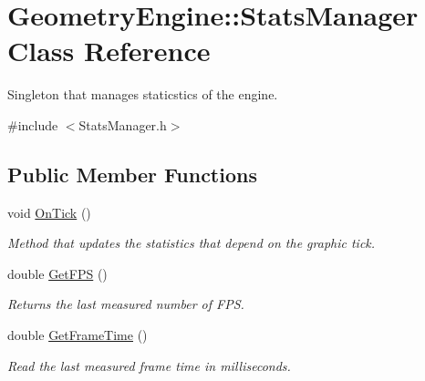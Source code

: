 \hypertarget{class_geometry_engine_1_1_stats_manager}{}\section{Geometry\+Engine\+::Stats\+Manager Class Reference}
\label{class_geometry_engine_1_1_stats_manager}


Singleton that manages staticstics of the engine.  




{\ttfamily \#include $<$Stats\+Manager.\+h$>$}

\subsection*{Public Member Functions}
\begin{DoxyCompactItemize}
\item 
\mbox{\label{class_geometry_engine_1_1_stats_manager_a7cafa3df522a5e8d3fa7cfce8d4a7e1e}} 
void \mbox{\hyperlink{class_geometry_engine_1_1_stats_manager_a7cafa3df522a5e8d3fa7cfce8d4a7e1e}{On\+Tick}} ()
\begin{DoxyCompactList}\small\item\em Method that updates the statistics that depend on the graphic tick. \end{DoxyCompactList}\item 
\mbox{\label{class_geometry_engine_1_1_stats_manager_ade8036883452fb26f29602899ad6f221}} 
double \mbox{\hyperlink{class_geometry_engine_1_1_stats_manager_ade8036883452fb26f29602899ad6f221}{Get\+F\+PS}} ()
\begin{DoxyCompactList}\small\item\em Returns the last measured number of F\+PS. \end{DoxyCompactList}\item 
\mbox{\label{class_geometry_engine_1_1_stats_manager_a58da2b7e3a2520e954ccb48e840edd92}} 
double \mbox{\hyperlink{class_geometry_engine_1_1_stats_manager_a58da2b7e3a2520e954ccb48e840edd92}{Get\+Frame\+Time}} ()
\begin{DoxyCompactList}\small\item\em Read the last measured frame time in milliseconds. \end{DoxyCompactList}\end{DoxyCompactItemize}
